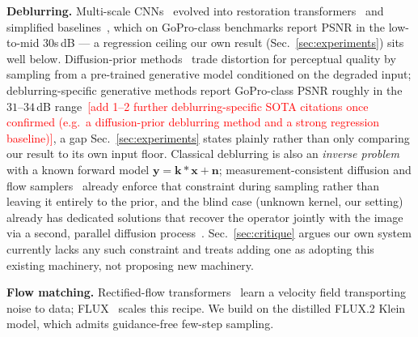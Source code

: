 \documentclass{article}
\newcommand{\authnote}[1]{\textcolor{red}{\footnotesize [#1]}}
\def\x{{\mathbf x}}
\def\y{{\mathbf y}}
\begin{document}
\textbf{Deblurring.} Multi-scale CNNs~\cite{nah2017deep} evolved into restoration transformers~\cite{zamir2022restormer,kong2023efficient} and simplified baselines~\cite{chen2022nafnet}, which on GoPro-class benchmarks report PSNR in the low-to-mid $30$s\,dB — a regression ceiling our own result (Sec.~\ref{sec:experiments}) sits well below. Diffusion-prior methods~\cite{lin2023diffbir,wang2024exploiting,wu2024osediff} trade distortion for perceptual quality by sampling from a pre-trained generative model conditioned on the degraded input; deblurring-specific generative methods report GoPro-class PSNR roughly in the $31$--$34$\,dB range~\cite{deblurflow2026}\authnote{add 1--2 further deblurring-specific SOTA citations once confirmed (e.g.\ a diffusion-prior deblurring method and a strong regression baseline)}, a gap Sec.~\ref{sec:experiments} states plainly rather than only comparing our result to its own input floor. Classical deblurring is also an \emph{inverse problem} with a known forward model $\y=\mathbf{k}*\x+\mathbf{n}$; measurement-consistent diffusion and flow samplers~\cite{chung2023diffusion,flowdps2025} already enforce that constraint during sampling rather than leaving it entirely to the prior, and the blind case (unknown kernel, our setting) already has dedicated solutions that recover the operator jointly with the image via a second, parallel diffusion process~\cite{blinddps2022,blindpnpdm2025}. Sec.~\ref{sec:critique} argues our own system currently lacks any such constraint and treats adding one as adopting this existing machinery, not proposing new machinery.

\textbf{Flow matching.} Rectified-flow transformers~\cite{lipman2023flow,liu2023flow,esser2024scaling} learn a velocity field transporting noise to data; FLUX~\cite{flux2024} scales this recipe. We build on the distilled FLUX.2 Klein model, which admits guidance-free few-step sampling.
\end{document}
